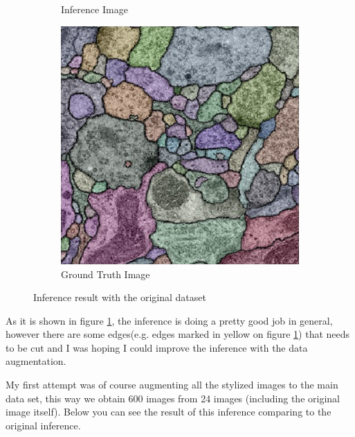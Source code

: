 \documentclass[12pt, a4paper]{scrartcl}
\begin{document}
\begin{figure}[H]
\begin{subfigure}{.3\textwidth}
  \caption{Inference Image}
  \label{fig:oi2}
\end{subfigure}
\begin{subfigure}{.3\textwidth}
  \centering
  \includegraphics[width=.9\linewidth]{oi3}
  \caption{Ground Truth Image}
  \label{fig:oi3}
\end{subfigure}

\label{fig:original_inference}
\caption{Inference result with the original dataset}
\end{figure}

As it is shown in figure \ref{fig:oi2}, the inference is doing a pretty good job in general, however there are some edges(e.g. edges marked in yellow on figure \ref{fig:oi2}) that needs to be cut and I was hoping I could improve the inference with the data augmentation.

My first attempt was of course augmenting all the stylized images to the main data set, this way we obtain 600 images from 24 images (including the original image itself). Below you can see the result of this inference comparing to the original inference.
\end{document}
